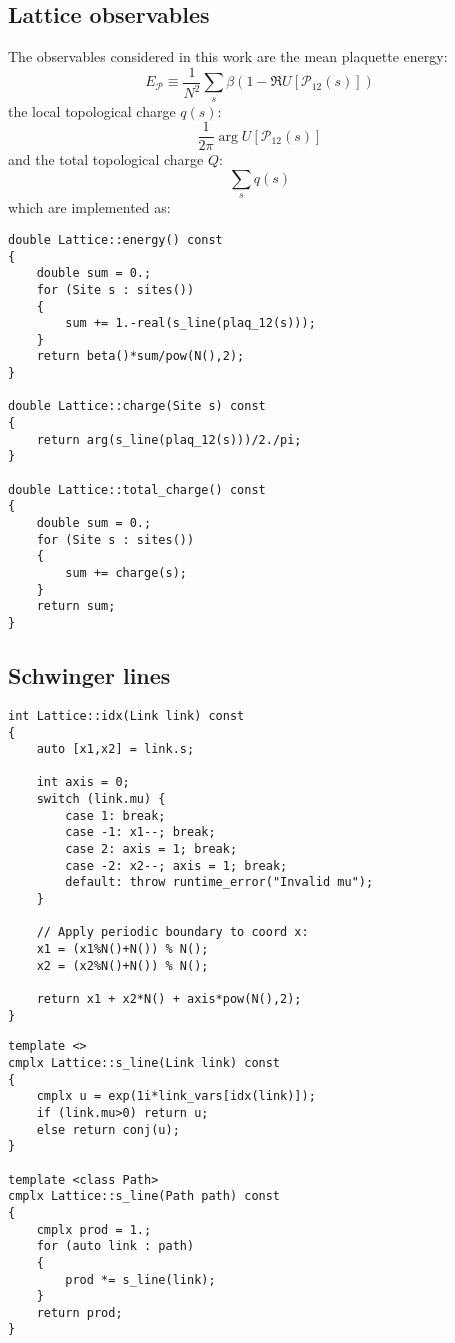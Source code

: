 \subsection*{Lattice observables}

The observables considered in this work are the mean plaquette energy:
\[
    E_{\mathcal P} \equiv \frac{1}{N^2}\sum_s \beta\left(1-\Re U[\mathcal P_{12}(s)]\right)
\]
the local topological charge $q(s)$:
\[
    \frac{1}{2\pi}\arg U[\mathcal P_{12}(s)]
\]
and the total topological charge $Q$:
\[
    \sum_s q(s)
\]
which are implemented as:
\begin{lstlisting}[caption={Lattice observables}]
double Lattice::energy() const
{
    double sum = 0.;
    for (Site s : sites())
    {
        sum += 1.-real(s_line(plaq_12(s)));
    }
    return beta()*sum/pow(N(),2);
}

double Lattice::charge(Site s) const
{
    return arg(s_line(plaq_12(s)))/2./pi;
}

double Lattice::total_charge() const
{
    double sum = 0.;
    for (Site s : sites())
    {
        sum += charge(s);
    }
    return sum;
}
\end{lstlisting}

\subsection*{Schwinger lines}

\begin{lstlisting}[caption={Link indexing}]
int Lattice::idx(Link link) const
{
    auto [x1,x2] = link.s;
    
    int axis = 0;
    switch (link.mu) {
        case 1: break;
        case -1: x1--; break;
        case 2: axis = 1; break;
        case -2: x2--; axis = 1; break;
        default: throw runtime_error("Invalid mu");
    }

    // Apply periodic boundary to coord x:
    x1 = (x1%N()+N()) % N();
    x2 = (x2%N()+N()) % N();
    
    return x1 + x2*N() + axis*pow(N(),2);
}
\end{lstlisting}

\begin{lstlisting}[caption={Schwinger lines}]
template <>
cmplx Lattice::s_line(Link link) const
{
    cmplx u = exp(1i*link_vars[idx(link)]);
    if (link.mu>0) return u;
    else return conj(u);
}

template <class Path>
cmplx Lattice::s_line(Path path) const
{
    cmplx prod = 1.;
    for (auto link : path)
    {
        prod *= s_line(link);
    }
    return prod;
}
\end{lstlisting}

